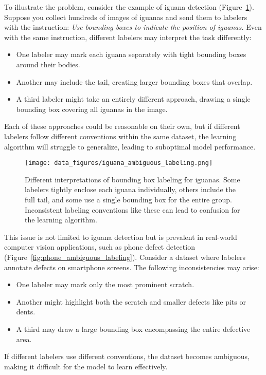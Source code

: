 \documentclass[12pt,openany]{book}
\begin{document}
To illustrate the problem, consider the example of iguana detection (Figure~\ref{fig:iguana_ambiguous_labeling}). Suppose you collect hundreds of images of iguanas and send them to labelers with the instruction: \textit{Use bounding boxes to indicate the position of iguanas.} Even with the same instruction, different labelers may interpret the task differently:
\begin{itemize}
    \item One labeler may mark each iguana separately with tight bounding boxes around their bodies.
    \item Another may include the tail, creating larger bounding boxes that overlap.
    \item A third labeler might take an entirely different approach, drawing a single bounding box covering all iguanas in the image.
\end{itemize}
Each of these approaches could be reasonable on their own, but if different labelers follow different conventions within the same dataset, the learning algorithm will struggle to generalize, leading to suboptimal model performance.

\begin{figure}[H]
    \centering
    \texttt{[image: data\_figures/iguana\_ambiguous\_labeling.png]}
    \caption{Different interpretations of bounding box labeling for iguanas. Some labelers tightly enclose each iguana individually, others include the full tail, and some use a single bounding box for the entire group. Inconsistent labeling conventions like these can lead to confusion for the learning algorithm.}
    \label{fig:iguana_ambiguous_labeling}
\end{figure}

This issue is not limited to iguana detection but is prevalent in real-world computer vision applications, such as phone defect detection (Figure~\ref{fig:phone_ambiguous_labeling}). Consider a dataset where labelers annotate defects on smartphone screens. The following inconsistencies may arise:
\begin{itemize}
    \item One labeler may mark only the most prominent scratch.
    \item Another might highlight both the scratch and smaller defects like pits or dents.
    \item A third may draw a large bounding box encompassing the entire defective area.
\end{itemize}
If different labelers use different conventions, the dataset becomes ambiguous, making it difficult for the model to learn effectively.
\end{document}
